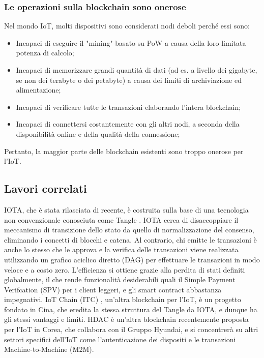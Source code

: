 \subsubsection{Le operazioni sulla blockchain sono onerose}
Nel mondo IoT, molti dispositivi sono considerati nodi deboli perché essi sono:
\begin{itemize}
	\item
	      Incapaci di eseguire il "mining" basato su PoW a causa della loro limitata potenza di calcolo;
	\item
	      Incapaci di memorizzare grandi quantità di dati (ad es. a livello dei gigabyte, se non dei terabyte o dei petabyte) a causa dei limiti di archiviazione ed alimentazione;
	\item
	      Incapaci di verificare tutte le transazioni elaborando l'intera blockchain;
	\item
	      Incapaci di connettersi costantemente con gli altri nodi, a seconda della disponibilità online e della qualità della connessione;
\end{itemize}
Pertanto, la maggior parte delle blockchain esistenti sono troppo onerose per l'IoT.

\subsection{Lavori correlati}
IOTA, che è stata rilasciata di recente, è costruita sulla base di una tecnologia non convenzionale conosciuta come Tangle \cite{c24}. IOTA cerca di disaccoppiare il meccanismo di transizione dello stato da quello di normalizzazione del consenso, eliminando i concetti di blocchi e catena. Al contrario, chi emitte le transazioni è anche lo stesso che le approva e la verifica delle transazioni viene realizzata utilizzando un grafico aciclico diretto (DAG) per effettuare le transazioni in modo veloce e a costo zero. L'efficienza si ottiene grazie alla perdita di stati definiti globalmente, il che rende funzionalità desiderabili quali il Simple Payment Verifcation (SPV) per i client leggeri, e gli smart contract abbastanza impegnativi. IoT Chain (ITC) \cite{c16}, un'altra blockchain per l'IoT, è un progetto fondato in Cina, che eredita la stessa struttura del Tangle da IOTA, e dunque ha gli stessi vantaggi e limiti. HDAC \cite{c13} è un'altra blockchain recentemente proposta per l'IoT in Corea, che collabora con il Gruppo Hyundai, e si concentrerà su altri settori specifici dell'IoT come l'autenticazione dei dispositi e le transazioni Machine-to-Machine (M2M).
